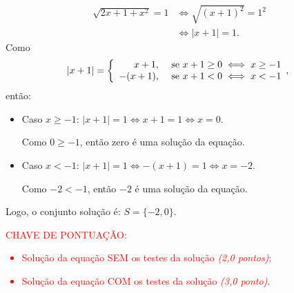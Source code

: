 \begin{align*} %
    \sqrt{2x + 1  + x^{2}} = 1 & \iff \sqrt{(x+1)^{2}} = 1^{2} \\
                               & \iff |x + 1| = 1.
\end{align*}
Como $$|x + 1| = \left\{
    \begin{array}{r l}
        x + 1,   & \text{ se } x+1 \geq 0 \iff x \geq -1 \\
        -(x +1), & \text{ se } x+1 < 0 \iff x < -1
    \end{array},
    \right .$$
então:
\begin{itemize}
    \item Caso $x \geq -1$: $ |x + 1| = 1 \iff x + 1 = 1 \iff x = 0$.

          Como $0 \geq -1$, então zero é uma solução da equação.
    \item Caso $x < -1$: $ |x + 1| = 1 \iff -(x +1) = 1 \iff x = -2$.

          Como $-2 < -1$, então $-2$ é uma solução da equação.
\end{itemize}
Logo, o conjunto solução é: $S = \{-2, 0 \}$.




\bigskip

\textcolor{red}{CHAVE DE PONTUAÇÃO:
    \begin{itemize}
        \item  Solução da equação SEM os testes da solução \emph{(2,0 pontos)};
        \item  Solução da equação COM os testes da solução \emph{(3,0 ponto)}.
    \end{itemize} }